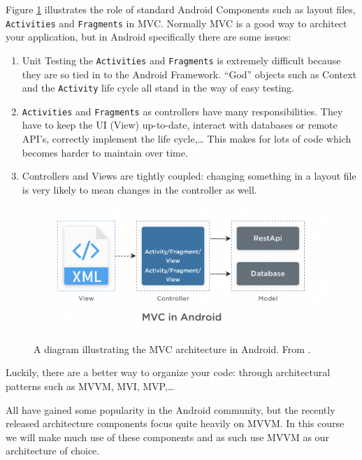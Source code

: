 Figure \ref{fig:MVCdiagram} illustrates the role of standard Android Components such as layout files, \lstinline!Activities! and \lstinline!Fragments! in MVC.
Normally MVC is a good way to architect your application, but in Android specifically there are some issues:

\begin{enumerate}
	\item Unit Testing the \lstinline!Activities! and \lstinline!Fragments! is extremely difficult because they are so tied in to the Android Framework.
	``God'' objects such as Context and the \lstinline!Activity! life cycle all stand in the way of easy testing.
	\item \lstinline!Activities! and \lstinline!Fragments! as controllers have many responsibilities. 
	They have to keep the UI (View) up-to-date, interact with databases or remote API's, correctly implement the life cycle,\ldots
	This makes for lots of code which becomes harder to maintain over time.
	\item Controllers and Views are tightly coupled: changing something in a layout file is very likely to mean changes in the controller as well. 
\end{enumerate}

\begin{figure}[ht]
	\centering
	\includegraphics[width=\textwidth]{images/mvvm/MVC_diagram.png}
	\label{fig:MVCdiagram}
	\caption{A diagram illustrating the MVC architecture in Android. From \cite{simform}.}
\end{figure}

Luckily, there are a better way to organize your code: through architectural patterns such as MVVM, MVI, MVP,\ldots

All have gained some popularity in the Android community, but the recently released architecture components \cite{architectureComponents} focus quite heavily on MVVM.
In this course we will make much use of these components and as such use MVVM as our architecture of choice.

